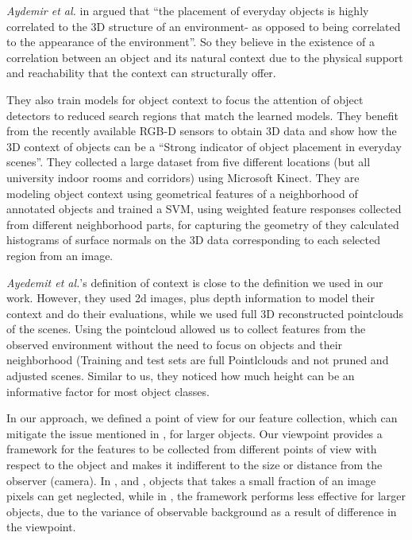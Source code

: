      
     \textit{Aydemir et al.} in  \cite{aydemir2012_3Dcontext} argued that ``the placement of everyday objects is highly correlated to the 3D structure of an environment- as opposed to being correlated to the appearance of the environment''. So they believe in the existence of a correlation between an object and its natural context due to the physical support and reachability that the context can structurally offer. 
     
     They also train models for object context to focus the attention of object detectors to reduced search regions that match the learned models. They benefit from the recently available RGB-D sensors to obtain 3D data and show how the 3D context of objects can be a ``Strong indicator of object placement in everyday scenes''. They collected a large dataset from five different locations (but all university indoor rooms and corridors) using Microsoft Kinect. They are modeling object context using geometrical features of a neighborhood of annotated objects and trained a SVM, using weighted feature responses collected from different neighborhood parts, for capturing the geometry of they calculated histograms of surface normals on the 3D data corresponding to each selected region from an image.
     
     \textit{Ayedemit et al.}'s definition of context is close to the definition we used in our work. However, they used 2d images, plus depth information to model their context and do their evaluations, while we used full 3D reconstructed pointclouds of the scenes. Using the pointcloud allowed us to collect features from the observed environment without the need to focus on objects and their neighborhood (Training and test sets are full Pointlclouds and not pruned and adjusted scenes. Similar to us, they noticed how much height can be an informative factor for most object classes. 
     
     In our approach, we defined a point of view for our feature collection, which can mitigate the issue mentioned in \cite{aydemir2012_3Dcontext}, for larger objects. Our viewpoint provides a framework for the features to be collected from different points of view with respect to the object and makes it indifferent to the size or distance from the observer (camera). In \cite{TorralbaContextualPriming}, \cite{TrollbaContexBased} and \cite{PerkoLeonardisContextDriven}, objects that takes a small fraction of an image pixels can get neglected, while in \cite{aydemir2012_3Dcontext}, the framework performs less effective for larger objects, due to the variance of observable background as a result of difference in the viewpoint. 
     
